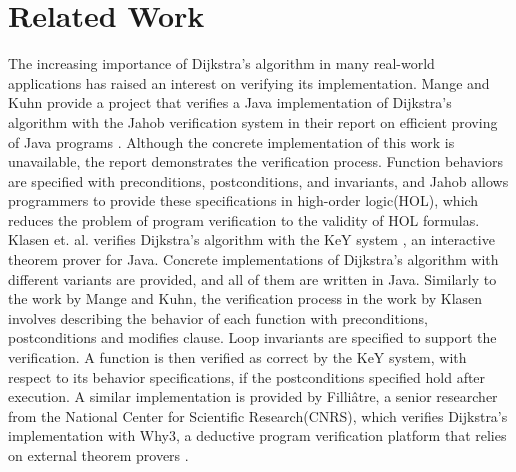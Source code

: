 
\section{Related Work}
The increasing importance of Dijkstra's algorithm in many real-world applications has raised an interest on verifying its implementation. Mange and Kuhn provide a project that verifies a Java implementation of Dijkstra's algorithm with the Jahob verification system in their report on efficient proving of Java programs \cite{Mange}. Although the concrete implementation of this work is unavailable, the report demonstrates the verification process. Function behaviors are specified with preconditions, postconditions, and invariants, and Jahob allows programmers to provide these specifications in high-order logic(HOL), which reduces the problem of program verification to the validity of HOL formulas. 
\\

Klasen et. al. verifies Dijkstra's algorithm with the KeY system \cite{Klasen}, an interactive theorem prover for Java. Concrete implementations of Dijkstra's algorithm with different variants are provided, and all of them are written in Java. Similarly to the work by Mange and Kuhn, the verification process in the work by Klasen involves describing the behavior of each function with preconditions, postconditions and modifies clause. Loop invariants are specified to support the verification. A function is then verified as correct by the KeY system, with respect to its behavior specifications, if the postconditions specified hold after execution. A similar implementation is provided by Filliâtre, a senior researcher from the National Center for Scientific Research(CNRS), which verifies Dijkstra's implementation with Why3, a deductive program verification platform that relies on external theorem provers \cite{Jean}\cite{why3}. 
\\

